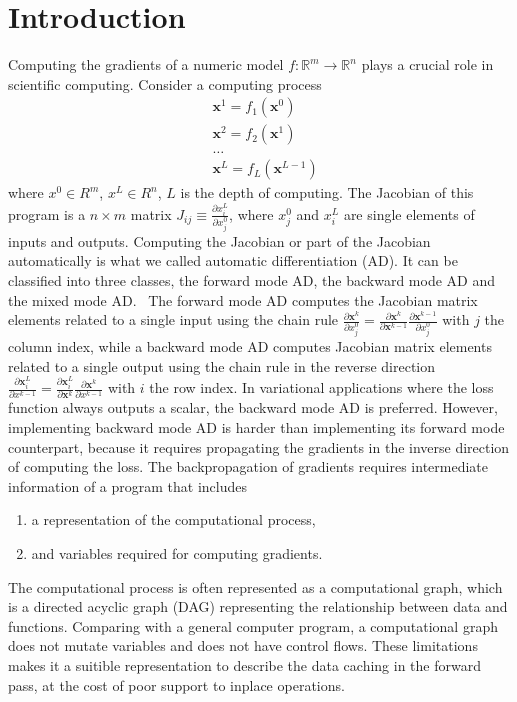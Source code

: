 \documentclass{article}
\newcommand{\<}{\langle}
\renewcommand{\>}{\rangle}
\newcommand{\vx}{{\mathbf{x}}}
\theoremstyle{definition}\newtheorem{definition}{\textit{Definition}}
\begin{document}
\section{Introduction}\label{sec:intro}
    Computing the gradients of a numeric model $f : \mathbb{R}^m \rightarrow \mathbb{R}^n$ plays a crucial role in scientific computing. Consider a computing process
\begin{align*}
    &\vx^1 = f_1(\vx^0)\\
    &\vx^2 = f_2(\vx^1)\\
    &\ldots\\
    &\vx^L = f_L(\vx^{L-1})
\end{align*}
where $x^0\in R^m$, $x^L\in R^n$, $L$ is the depth of computing.
The Jacobian of this program is a $n\times m$ matrix $J_{ij} \equiv \frac{\partial x^L_i}{\partial x_j^0}$, where $x_j^0$ and $x_i^L$ are single elements of inputs and outputs.
Computing the Jacobian or part of the Jacobian automatically is what we called automatic differentiation (AD). It can be classified into three classes, the forward mode AD, the backward mode AD and the mixed mode AD.~\cite{Hascoet2013}
    The forward mode AD computes the Jacobian matrix elements related to a single input using the chain rule $\frac{\partial \vx^k}{\partial x^0_j} = \frac{\partial \vx^k}{\partial \vx^{k-1}}\frac{\partial \vx^{k-1}}{\partial x^0_j}$ with $j$ the column index, while a backward mode AD computes Jacobian matrix elements related to a single output using the chain rule in the reverse direction $\frac{\partial \vx^L_i}{\partial x^{k-1}} = \frac{\partial \vx^L_i}{\partial \vx^{k}}\frac{\partial \vx^{k}}{\partial x^{k-1}}$ with $i$ the row index.
    In variational applications where the loss function always outputs a scalar, the backward mode AD is preferred.
However, implementing backward mode AD is harder than implementing its forward mode counterpart, because it requires propagating the gradients in the inverse direction of computing the loss. The backpropagation of gradients requires intermediate information of a program that includes
\begin{enumerate}
    \item a representation of the computational process,
    \item and variables required for computing gradients.
\end{enumerate}
    The computational process is often represented as a computational graph, which is a directed acyclic graph (DAG) representing the relationship between data and functions. Comparing with a general computer program, a computational graph does not mutate variables and does not have control flows. These limitations makes it a suitible representation to describe the data caching in the forward pass, at the cost of poor support to inplace operations.
\end{document}
